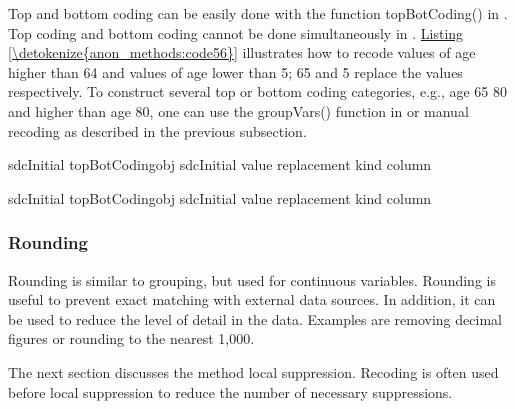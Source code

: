 \documentclass[letterpaper,10pt,english]{sphinxmanual}
\begin{document}
Top and bottom coding can be easily done with the function
topBotCoding() in . Top coding and bottom coding cannot be
done simultaneously in . \hyperref[\detokenize{anon_methods:code56}]{Listing \ref{\detokenize{anon_methods:code56}}} illustrates how to recode
values of age higher than 64 and values of age lower than 5; 65 and 5
replace the values respectively. To construct several top or bottom
coding categories, e.g., age 65 \textendash{} 80 and higher than age 80, one can use
the groupVars() function in  or manual recoding as described
in the previous subsection.

\def\sphinxLiteralBlockLabel{\label{\detokenize{anon_methods:code56}}}
%
\begin{sphinxVerbatim}[commandchars=\\\{\},numbers=left,firstnumber=1,stepnumber=1]
 sdcInitial  topBotCodingobj  sdcInitial value   replacement   kind   column  

 sdcInitial  topBotCodingobj  sdcInitial value   replacement   kind   column  
\end{sphinxVerbatim}


\subsubsection{Rounding}
\label{\detokenize{anon_methods:rounding}}
Rounding is similar to grouping, but used for continuous variables.
Rounding is useful to prevent exact matching with external data sources.
In addition, it can be used to reduce the level of detail in the data.
Examples are removing decimal figures or rounding to the nearest 1,000.

The next section discusses the method local suppression. Recoding is
often used before local suppression to reduce the number of necessary
suppressions.
\end{document}
